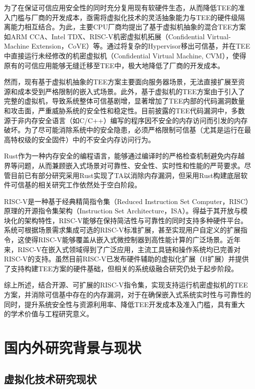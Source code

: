 \documentclass[master, vlined, review]{DissertUESTC}
\begin{document}
	为了在保证可信应用安全性的同时充分复用现有软硬件生态，从而降低TEE的准入门槛与厂商的开发成本，亟需将虚拟化技术的灵活抽象能力与TEE的硬件级隔离能力相互结合。为此，主要CPU厂商均提出了基于虚拟机抽象的混合TEE方案如ARM CCA、Intel TDX、RISC-V机密虚拟机拓展（Confidential Virtual-Machine Extension，CoVE）等。通过将复杂的Hypervisor移出可信基，并在TEE中直接运行未经修改的机密虚拟机（Confidential Virtual Machine, CVM），使得原有的可信应用能够无缝迁移至TEE中，极大地降低了厂商的开发成本。
	
	然而，现有基于虚拟机抽象的TEE方案主要面向服务器场景，无法直接扩展至资源和成本受到严格限制的嵌入式场景。此外，基于虚拟机的TEE方案由于引入了完整的虚拟机，导致系统整体可信基剧增，显著增加了TEE内部的代码漏洞数量和攻击面，严重威胁系统的安全性和稳定性。目前披露的TEE代码漏洞中，多数源于非内存安全语言（如C/C++）编写的程序因不安全的内存访问而引发的内存破坏。为了尽可能消除系统中的安全隐患，必须严格限制可信基（尤其是运行在最高特权级的安全固件）中的不安全内存访问行为。
	
	Rust作为一种内存安全的编程语言，能够通过编译时的严格检查机制避免内存越界等问题，从而兼顾嵌入式场景对可靠性、安全性、实时性和性能的严苛要求。尽管目前已有部分研究采用Rust实现了TA以消除内存漏洞，但采用Rust构建底层软件可信基的相关研究工作依然处于空白阶段。
	
	RISC-V是一种基于经典精简指令集（Reduced Instruction Set Computer，RISC）原理的开源指令集架构（Instruction Set Architecture，ISA）。得益于其开放与模块化的架构特性，RISC-V能够在保持简洁性与可靠性的同时支持多种硬件平台。系统可根据场景需求集成可选的RISC-V标准扩展，甚至实现用户自定义的扩展指令，这使得RISC-V能够覆盖从嵌入式微控制器到高性能计算的广泛场景。近年来，RISC-V在嵌入式领域得到了广泛应用，主流工具链和操作系统均已完善对RISC-V的支持。虽然目前RISC-V已发布硬件辅助的虚拟化扩展（H扩展）并提供了支持构建TEE方案的硬件基础，但相关的系统级融合研究仍处于起步阶段。
	
	综上所述，结合开源、可扩展的RISC-V指令集，实现支持运行机密虚拟机的TEE方案，并消除可信基中存在的内存漏洞，对于在确保嵌入式系统实时性与可靠性的同时，提升系统安全性与资源利用率、降低TEE开发成本及准入门槛，具有重大的学术价值与工程研究意义。
	
	\section{国内外研究背景与现状}
	
	\subsection{虚拟化技术研究现状}
	
\end{document}
